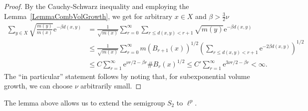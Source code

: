 \documentclass[10pt]{amsart}
\theoremstyle{definition}
\begin{document}
\begin{proof}
 By the Cauchy-Schwarz inequality and employing the Lemma~\ref{LemmaCombVolGrowth}, we get for arbitrary $x\in X$ and $\beta>\frac{3}{2}\nu$
    \begin{align*}
        \sum_{y\in X}\sqrt{\frac{m(y)}{m(x)}}\mathrm{e}^{-\beta d(x,y)}
        &= \frac{1}{\sqrt{m(x)}}\sum_{r= 0}^\infty 
        \sum_{ r\leq d(x,y)<r+1}\sqrt{ {m(y)} }\mathrm{e}^{-\beta d(x,y)}\\
        &\leq \frac{1}{\sqrt{m(x)}}\sum_{r= 0}^\infty m(B_{r+1}(x))^{1\slash 2}\left(\sum_{r\leq d(x,y)<r+1}\mathrm{e}^{-2\beta d(x,y)}\right)^{1\slash 2}\\
        &\leq C\sum_{r = 1}^\infty\mathrm{e}^{\nu r\slash 2-\beta r}  \#B_{r}(x)^{1\slash 2} \leq C'\sum_{r = 1}^\infty \mathrm{e}^{3\nu r\slash 2-\beta r} <\infty.
\end{align*}
The ``in particular'' statement follows by noting that, for subexponential volume growth, we can choose $\nu$ arbitrarily small.
\end{proof}

The lemma above allows us to extend the semigroup $S_2$ to $\ell^p.$
\end{document}
